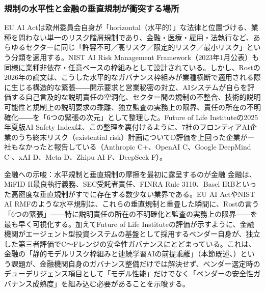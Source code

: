 \subsubsection*{規制の水平性と金融の垂直規制が衝突する場所}

EU AI Actは欧州委員会自身が「horizontal（水平的）」な法律と位置づける、業種を問わない単一のリスク階層規制であり、金融・医療・雇用・法執行など、あらゆるセクターに同じ「許容不可／高リスク／限定的リスク／最小リスク」という分類を適用する\cite{y07euaiacthorizontal}。NIST AI Risk Management Framework（2023年1月公表）も同様に業種非依存・任意ベースの枠組みとして設計されている\cite{y07nistairmf2023}。しかし、Rostの2026年の論文は、こうした水平的なガバナンス枠組みが業種横断で適用される際に生じる構造的な緊張――開示要求と営業秘密の対立、AIシステムが自らを評価する自己言及的な説明責任の空洞化、セクター間の規制の不整合、技術的説明可能性と規制上の説明要求の乖離、独立監査の実務上の限界、責任の所在の不明確化――を「6つの緊張の次元」として整理した\cite{y07govopacity2026}。Future of Life Instituteの2025年夏版AI Safety Indexは、この整理を裏付けるように、7社のフロンティアAI企業のうち終末リスク（existential risk）計画についてD評価を上回った企業が一社もなかったと報告している（Anthropic C+、OpenAI C、Google DeepMind C-、xAI D、Meta D、Zhipu AI F、DeepSeek F）\cite{y07flisafetyindex2025}。

\begin{insight}{金融への示唆：水平規制と垂直規制の摩擦を最初に露呈するのが金融}
金融は、MiFID II最良執行義務、SEC受託者責任、FINRA Rule 3110、Basel IRBといった高密度な垂直規制がすでに存在する数少ない業界である。EU AI ActやNIST AI RMFのような水平規制は、これらの垂直規制と重畳した瞬間に、Rostの言う「6つの緊張」――特に説明責任の所在の不明確化と監査の実務上の限界――を最も早く可視化する。加えてFuture of Life Instituteの評価が示すように、金融機関がエージェント型投資システムの基盤として採用するベンダー自身が、独立した第三者評価でC〜Fレンジの安全性ガバナンスにとどまっている。これは、金融の「静的モデルリスク枠組みと連続学習AIの前提乖離」（本節既述、\cite{x07agenticregulator2025}）という課題が、金融機関自身のガバナンス整備だけでは解決せず、ベンダー選定時のデューデリジェンス項目として「モデル性能」だけでなく「ベンダーの安全性ガバナンス成熟度」を組み込む必要があることを示唆する。
\end{insight}

